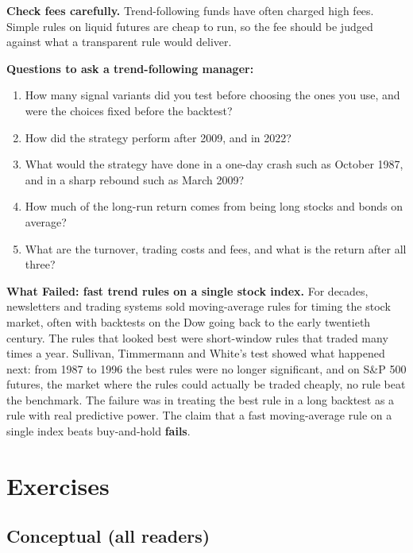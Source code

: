 \textbf{Check fees carefully.} Trend-following funds have often charged high fees. Simple rules on liquid futures are cheap to run, so the fee should be judged against what a transparent rule would deliver.

\textbf{Questions to ask a trend-following manager:}

\begin{enumerate}
  \item How many signal variants did you test before choosing the ones you use, and were the choices fixed before the backtest?
  \item How did the strategy perform after 2009, and in 2022?
  \item What would the strategy have done in a one-day crash such as October 1987, and in a sharp rebound such as March 2009?
  \item How much of the long-run return comes from being long stocks and bonds on average?
  \item What are the turnover, trading costs and fees, and what is the return after all three?
\end{enumerate}

\begin{callout}
\textbf{What Failed: fast trend rules on a single stock index.} For decades, newsletters and trading systems sold moving-average rules for timing the stock market, often with backtests on the Dow going back to the early twentieth century. The rules that looked best were short-window rules that traded many times a year. Sullivan, Timmermann and White's test showed what happened next: from 1987 to 1996 the best rules were no longer significant, and on S\&P 500 futures, the market where the rules could actually be traded cheaply, no rule beat the benchmark. The failure was in treating the best rule in a long backtest as a rule with real predictive power. The claim that a fast moving-average rule on a single index beats buy-and-hold \textbf{fails}.
\end{callout}

\section*{Exercises}

\subsection*{Conceptual (all readers)}

